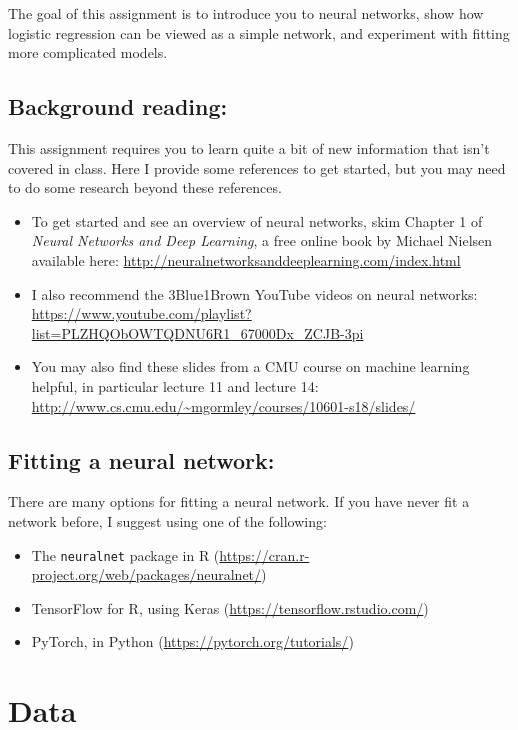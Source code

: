 \documentclass[11pt]{article}
\begin{document}
The goal of this assignment is to introduce you to neural networks, show how logistic regression can be viewed as a simple network, and experiment with fitting more complicated models.

\subsection*{Background reading:} This assignment requires you to learn quite a bit of new information that isn't covered in class. Here I provide some references to get started, but you may need to do some research beyond these references.

\begin{itemize}
\item To get started and see an overview of neural networks, skim Chapter 1 of \textit{Neural Networks and Deep Learning}, a free online book by Michael Nielsen available here: \url{http://neuralnetworksanddeeplearning.com/index.html}
\item I also recommend the 3Blue1Brown YouTube videos on neural networks: \url{https://www.youtube.com/playlist?list=PLZHQObOWTQDNU6R1_67000Dx_ZCJB-3pi}
\item You may also find these slides from a CMU course on machine learning helpful, in particular lecture 11 and lecture 14: \url{http://www.cs.cmu.edu/~mgormley/courses/10601-s18/slides/}
\end{itemize}

\subsection*{Fitting a neural network:} There are many options for fitting a neural network. If you have never fit a network before, I suggest using one of the following:

\begin{itemize}
\item The \texttt{neuralnet} package in R (\url{https://cran.r-project.org/web/packages/neuralnet/})
\item TensorFlow for R, using Keras (\url{https://tensorflow.rstudio.com/})
\item PyTorch, in Python (\url{https://pytorch.org/tutorials/})
\end{itemize}

\section*{Data}
\end{document}
